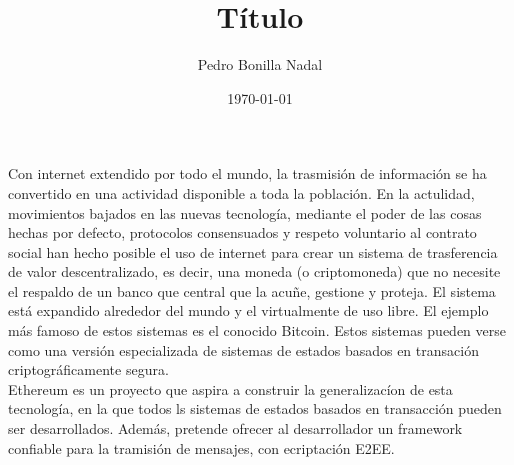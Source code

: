 \documentclass[11pt,a4paper]{article}
\title{Título}
\author{Pedro Bonilla Nadal}
\date{\today}
\begin{document}
\maketitle

Con internet extendido por todo el mundo, la trasmisión de información se ha convertido en una actividad disponible a toda la población. En la actulidad, movimientos  bajados en las nuevas tecnología, mediante el poder de las cosas hechas por defecto, protocolos consensuados y respeto voluntario al contrato social han hecho posible el uso de internet para crear un sistema de trasferencia de valor descentralizado, es decir, una moneda (o criptomoneda) que no necesite el respaldo de un banco que central que la acuñe, gestione y proteja. El sistema está expandido alrededor del mundo y el virtualmente de uso libre. El ejemplo más famoso de estos sistemas es el conocido Bitcoin. Estos sistemas pueden verse como una versión especializada de sistemas de estados basados en transación criptográficamente segura.\\

Ethereum es un proyecto que aspira a  construir la generalizacíon de esta tecnología, en la que todos ls sistemas de estados basados en transacción pueden ser desarrollados. Además, pretende ofrecer al desarrollador un framework confiable para la tramisión de mensajes, con ecriptación E2EE.
\end{document}

